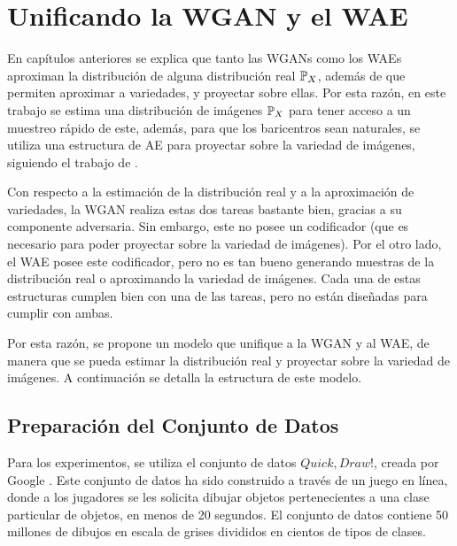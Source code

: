 \chapter{Unificando la WGAN y el WAE}\label{chap:WAE-WGAN}  %

En capítulos anteriores se explica que tanto las WGANs como los WAEs aproximan la distribución de alguna distribución real $\Prob_X$, además de que permiten aproximar a variedades, y proyectar sobre ellas.
Por esta razón, en este trabajo se estima una distribución de imágenes $\Prob_X$ para tener acceso a un muestreo rápido de este, además, para que los baricentros sean naturales, se utiliza una estructura de AE para proyectar sobre la variedad de imágenes, siguiendo el trabajo de \cite{simon2020barycenters}.


Con respecto a la estimación de la distribución real y a la aproximación de variedades, la WGAN realiza estas dos tareas bastante bien, gracias a su componente adversaria. Sin embargo, este no posee un codificador (que es necesario para poder proyectar sobre la variedad de imágenes). Por el otro lado, el WAE posee este codificador, pero no es tan bueno generando muestras de la distribución real o aproximando la variedad de imágenes. Cada una de estas estructuras cumplen bien con una de las tareas, pero no están diseñadas para cumplir con ambas.


Por esta razón, se propone un modelo que unifique a la WGAN y al WAE, de manera que se pueda estimar la distribución real y proyectar sobre la variedad de imágenes. A continuación se detalla la estructura de este modelo.

\section{Preparación del Conjunto de Datos}\label{ssec:preparacion-dataset}  %

Para los experimentos, se utiliza el conjunto de datos $Quick, Draw!$, creada por Google \cite{jongejan2016quick}. Este conjunto de datos ha sido construido a través de un juego en línea, donde a los jugadores se les solicita dibujar objetos pertenecientes a una clase particular de objetos, en menos de 20 segundos. El conjunto de datos contiene 50 millones de dibujos en escala de grises divididos en cientos de tipos de clases.

